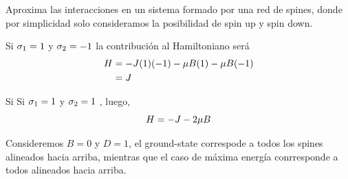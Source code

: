 Aproxima las interacciones en un sistema formado por una red de spines, donde por simplicidad solo consideramos la posibilidad de spin up y spin down.

\begin{ej}
	Si $\sigma_1=1$ y $\sigma_2=-1$ la contribución al Hamiltoniano será
	\begin{align}
  H&=-J(1)(-1)-\mu B(1)-\mu B(-1)\\
  &=J
\end{align}
\end{ej}

\begin{ej}
	Si Si $\sigma_1=1$ y $\sigma_2=1$ ,
	luego,
	\begin{equation}
  H=-J-2\mu B
\end{equation}
\end{ej}

Consideremos $B=0$ y $D=1$, el ground-state correspode a todos los spines alineados hacia arriba, mientras que el caso de máxima energía conrresponde a todos alineados hacia arriba.



































